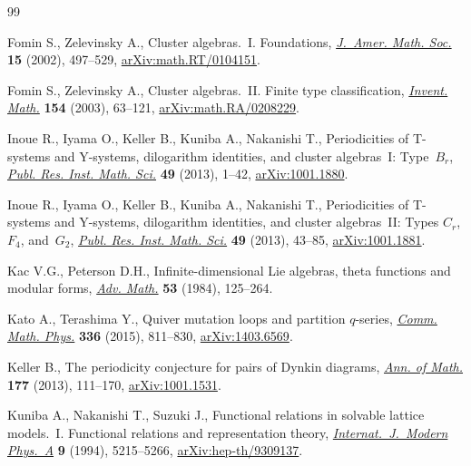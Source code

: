 \begin{thebibliography}{99}
\footnotesize\itemsep=0pt

Fomin S., Zelevinsky A., Cluster algebras.~{I}. {F}oundations, \href{https://doi.org/10.1090/S0894-0347-01-00385-X}{\textit{J.~Amer.
 Math. Soc.}} \textbf{15} (2002), 497--529, \href{https://arxiv.org/abs/math.RT/0104151}{arXiv:math.RT/0104151}.

Fomin S., Zelevinsky A., Cluster algebras.~{II}. {F}inite type classification,
 \href{https://doi.org/10.1007/s00222-003-0302-y}{\textit{Invent. Math.}} \textbf{154} (2003), 63--121,
 \href{https://arxiv.org/abs/math.RA/0208229}{arXiv:math.RA/0208229}.

Inoue R., Iyama O., Keller B., Kuniba A., Nakanishi T., Periodicities of
 {T}-systems and {Y}-systems, dilogarithm identities, and cluster
 algebras~{I}: {T}ype~{$B_r$}, \href{https://doi.org/10.4171/PRIMS/95}{\textit{Publ. Res. Inst. Math. Sci.}}
 \textbf{49} (2013), 1--42, \href{https://arxiv.org/abs/1001.1880}{arXiv:1001.1880}.

Inoue R., Iyama O., Keller B., Kuniba A., Nakanishi T., Periodicities of
 {T}-systems and {Y}-systems, dilogarithm identities, and cluster
 algebras~{II}: {T}ypes {$C_r$}, {$F_4$}, and~{$G_2$}, \href{https://doi.org/10.4171/PRIMS/96}{\textit{Publ. Res.
 Inst. Math. Sci.}} \textbf{49} (2013), 43--85, \href{https://arxiv.org/abs/1001.1881}{arXiv:1001.1881}.

Kac V.G., Peterson D.H., Infinite-dimensional {L}ie algebras, theta functions
 and modular forms, \href{https://doi.org/10.1016/0001-8708(84)90032-X}{\textit{Adv. Math.}} \textbf{53} (1984), 125--264.

Kato A., Terashima Y., Quiver mutation loops and partition {$q$}-series,
 \href{https://doi.org/10.1007/s00220-014-2224-5}{\textit{Comm. Math. Phys.}} \textbf{336} (2015), 811--830, \href{https://arxiv.org/abs/1403.6569}{arXiv:1403.6569}.

Keller B., The periodicity conjecture for pairs of {D}ynkin diagrams,
 \href{https://doi.org/10.4007/annals.2013.177.1.3}{\textit{Ann. of Math.}} \textbf{177} (2013), 111--170, \href{https://arxiv.org/abs/1001.1531}{arXiv:1001.1531}.

Kuniba A., Nakanishi T., Suzuki J., Functional relations in solvable lattice
 models.~{I}. {F}unctional relations and representation theory,
 \href{https://doi.org/10.1142/S0217751X94002119}{\textit{Internat.~J.~Modern Phys.~A}} \textbf{9} (1994), 5215--5266,
 \href{https://arxiv.org/abs/hep-th/9309137}{arXiv:hep-th/9309137}.


\end{thebibliography}
